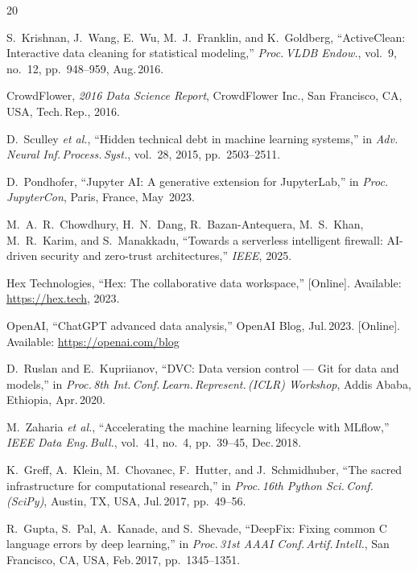 \documentclass[conference]{IEEEtran}
\begin{document}
\begin{thebibliography}{20}

S.~Krishnan, J.~Wang, E.~Wu, M.~J.~Franklin, and K.~Goldberg,
``ActiveClean: Interactive data cleaning for statistical modeling,''
\textit{Proc.\,VLDB Endow.}, vol.~9, no.~12, pp.~948--959, Aug.\,2016.

CrowdFlower, \textit{2016 Data Science Report},
CrowdFlower Inc., San Francisco, CA, USA, Tech.\,Rep., 2016.

D.~Sculley \textit{et al.},
``Hidden technical debt in machine learning systems,''
in \textit{Adv.\,Neural Inf.\,Process.\,Syst.}, vol.~28, 2015,
pp.~2503--2511.

D.~Pondhofer,
``Jupyter AI: A generative extension for JupyterLab,''
in \textit{Proc.\,JupyterCon}, Paris, France, May~2023.

M.~A.~R.~Chowdhury, H.~N.~Dang, R.~Bazan-Antequera, M.~S.~Khan,
M.~R.~Karim, and S.~Manakkadu,
``Towards a serverless intelligent firewall: AI-driven security
and zero-trust architectures,''
\textit{IEEE}, 2025.

Hex Technologies,
``Hex: The collaborative data workspace,''
[Online]. Available: \url{https://hex.tech}, 2023.

OpenAI, ``ChatGPT advanced data analysis,''
OpenAI Blog, Jul.\,2023.
[Online]. Available: \url{https://openai.com/blog}

D.~Ruslan and E.~Kupriianov,
``DVC: Data version control --- Git for data and models,''
in \textit{Proc.\,8th Int.\,Conf.\,Learn.\,Represent.\,(ICLR)
Workshop}, Addis Ababa, Ethiopia, Apr.\,2020.

M.~Zaharia \textit{et al.},
``Accelerating the machine learning lifecycle with MLflow,''
\textit{IEEE Data Eng.\,Bull.}, vol.~41, no.~4, pp.~39--45,
Dec.\,2018.

K.~Greff, A.~Klein, M.~Chovanec, F.~Hutter, and J.~Schmidhuber,
``The sacred infrastructure for computational research,''
in \textit{Proc.\,16th Python Sci.\,Conf.\,(SciPy)},
Austin, TX, USA, Jul.\,2017, pp.~49--56.

R.~Gupta, S.~Pal, A.~Kanade, and S.~Shevade,
``DeepFix: Fixing common C language errors by deep learning,''
in \textit{Proc.\,31st AAAI Conf.\,Artif.\,Intell.},
San Francisco, CA, USA, Feb.\,2017, pp.~1345--1351.


\end{thebibliography}
\end{document}
